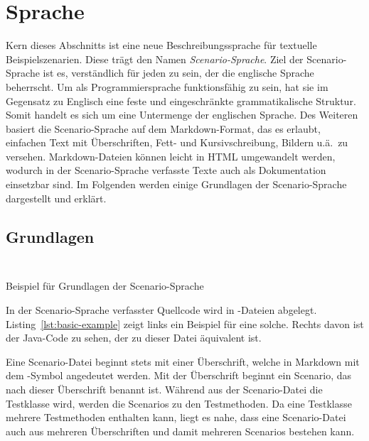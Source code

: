 \section{Sprache}\label{sec:language}

Kern dieses Abschnitts ist eine neue Beschreibungssprache für textuelle Beispielszenarien.
Diese trägt den Namen \emph{Scenario-Sprache}.
Ziel der Scenario-Sprache ist es, verständlich für jeden zu sein, der die englische Sprache beherrscht.
Um als Programmiersprache funktionsfähig zu sein, hat sie im Gegensatz zu Englisch eine feste und eingeschränkte grammatikalische Struktur.
Somit handelt es sich um eine Untermenge der englischen Sprache.
Des Weiteren basiert die Scenario-Sprache auf dem Markdown-Format, das es erlaubt, einfachen Text mit Überschriften, Fett- und Kursivschreibung, Bildern u.ä.\ zu versehen.
Markdown-Dateien können leicht in HTML umgewandelt werden, wodurch in der Scenario-Sprache verfasste Texte auch als Dokumentation einsetzbar sind.
Im Folgenden werden einige Grundlagen der Scenario-Sprache dargestellt und erklärt.

\subsection{Grundlagen}\label{subsec:basics}

\begin{listing}[htp]
    \begin{minipage}{0.45\textwidth}
        \centering
        \inputminted{md}{chapter/fulib-scenarios/scenarios/Basic.md}
    \end{minipage}
    \hspace{0.05\textwidth}
    \begin{minipage}{0.45\textwidth}
        \centering
        \inputminted{java}{chapter/fulib-scenarios/java/BasicTest.java}
    \end{minipage}
    \caption{Beispiel für Grundlagen der Scenario-Sprache}
    \label{lst:basic-example}
\end{listing}

In der Scenario-Sprache verfasster Quellcode wird in -Dateien abgelegt.
Listing~\ref{lst:basic-example} zeigt links ein Beispiel für eine solche.
Rechts davon ist der Java-Code zu sehen, der zu dieser Datei äquivalent ist.

Eine Scenario-Datei beginnt stets mit einer Überschrift, welche in Markdown mit dem \mdcode{#}-Symbol angedeutet werden.
Mit der Überschrift beginnt ein Scenario, das nach dieser Überschrift benannt ist.
Während aus der Scenario-Datei die Testklasse wird, werden die Scenarios zu den Testmethoden.
Da eine Testklasse mehrere Testmethoden enthalten kann, liegt es nahe, dass eine Scenario-Datei auch aus mehreren Überschriften und damit mehreren Scenarios bestehen kann.

